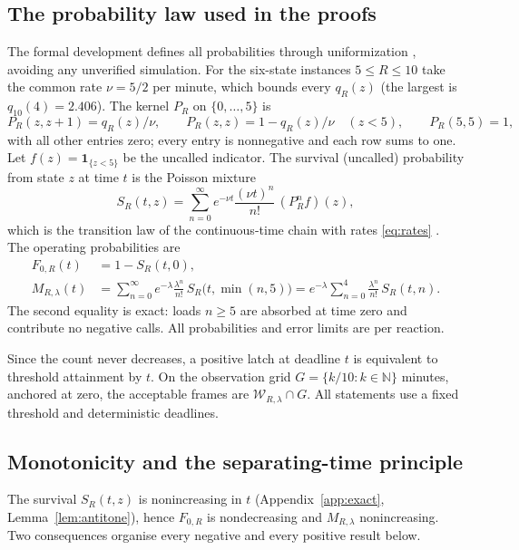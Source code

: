 \documentclass[11pt,a4paper]{article}
\theoremstyle{plain}
\theoremstyle{definition}
\theoremstyle{remark}
\newcommand{\N}{\mathbb N}
\newcommand{\Wc}{\mathcal W}
\newcommand{\one}{\mathbf 1}
\begin{document}
\subsection{The probability law used in the proofs}\label{sec:law}
The formal development defines all probabilities through uniformization \citep{jensen1953,grassmann1977}, avoiding any unverified simulation. For the six-state instances $5\le R\le10$ take the common rate $\nu=5/2$ per minute, which bounds every $q_R(z)$ (the largest is $q_{10}(4)=2.406$). The kernel $P_R$ on $\{0,\dots,5\}$ is
\begin{equation}\label{eq:kernel}
P_R(z,z+1)=q_R(z)/\nu,\qquad P_R(z,z)=1-q_R(z)/\nu\quad(z<5),\qquad P_R(5,5)=1,
\end{equation}
with all other entries zero; every entry is nonnegative and each row sums to one. Let $f(z)=\one_{\{z<5\}}$ be the uncalled indicator. The survival (uncalled) probability from state $z$ at time $t$ is the Poisson mixture
\begin{equation}\label{eq:source}
S_R(t,z)=\sum_{n=0}^{\infty}e^{-\nu t}\frac{(\nu t)^n}{n!}\,(P_R^nf)(z),
\end{equation}
which is the transition law of the continuous-time chain with rates \eqref{eq:rates} \citep{norris1997}. The operating probabilities are
\begin{align}
F_{0,R}(t)&=1-S_R(t,0),\label{eq:blank}\\
M_{R,\lambda}(t)&=\sum_{n=0}^{\infty}e^{-\lambda}\frac{\lambda^n}{n!}\,S_R\bigl(t,\min(n,5)\bigr)
=e^{-\lambda}\sum_{n=0}^{4}\frac{\lambda^n}{n!}\,S_R(t,n).\label{eq:miss}
\end{align}
The second equality is exact: loads $n\ge5$ are absorbed at time zero and contribute no negative calls. All probabilities and error limits are per reaction.

Since the count never decreases, a positive latch at deadline $t$ is equivalent to threshold attainment by $t$. On the observation grid $G=\{k/10:k\in\N\}$ minutes, anchored at zero, the acceptable frames are $\Wc_{R,\lambda}\cap G$. All statements use a fixed threshold and deterministic deadlines.

\subsection{Monotonicity and the separating-time principle}\label{sec:monotone}
The survival $S_R(t,z)$ is nonincreasing in $t$ (Appendix~\ref{app:exact}, Lemma~\ref{lem:antitone}), hence $F_{0,R}$ is nondecreasing and $M_{R,\lambda}$ nonincreasing. Two consequences organise every negative and every positive result below.
\end{document}
